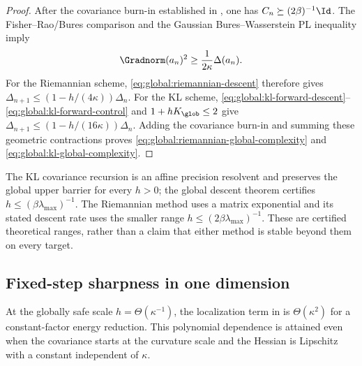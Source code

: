 \begin{proof}
After the covariance burn-in established in
, one has
\(C_n\succeq(2\beta)^{-1}\Id\).  The Fisher--Rao/Bures comparison and the Gaussian
Bures--Wasserstein PL inequality imply
\begin{equation}
\label{eq:global:discrete-pl-after-burnin}
    \Gradnorm(a_n)^2\geq\frac1{2\kappa}\Delta(a_n).
\end{equation}
For the Riemannian scheme,
\eqref{eq:global:riemannian-descent} therefore gives
\(
\Delta_{n+1}\leq(1-h/(4\kappa))\Delta_n
\).  For the KL scheme,
\eqref{eq:global:kl-forward-descent}--\eqref{eq:global:kl-forward-control} and
\(1+hK_{\glob}\leq2\) give
\(
\Delta_{n+1}\leq(1-h/(16\kappa))\Delta_n
\).  Adding the covariance burn-in and summing these geometric contractions proves
\eqref{eq:global:riemannian-global-complexity} and
\eqref{eq:global:kl-global-complexity}.
\end{proof}

The KL covariance recursion is an affine precision resolvent and preserves the global upper
barrier for every \(h>0\); the global descent theorem certifies \(h\leq
(\beta\lambda_{\max})^{-1}\).  The Riemannian method uses a matrix exponential and its stated
descent rate uses the smaller range \(h\leq(2\beta\lambda_{\max})^{-1}\).  These are certified
theoretical ranges, rather than a claim that either method is stable beyond them on every target.

\subsection{Fixed-step sharpness in one dimension}
\label{sec:global:discrete-sharpness}

At the globally safe scale \(h=\Theta(\kappa^{-1})\), the localization term in
 is \(\Theta(\kappa^2)\) for a constant-factor energy reduction.
This polynomial dependence is attained even when the covariance starts at the curvature scale and
the Hessian is Lipschitz with a constant independent of \(\kappa\).

